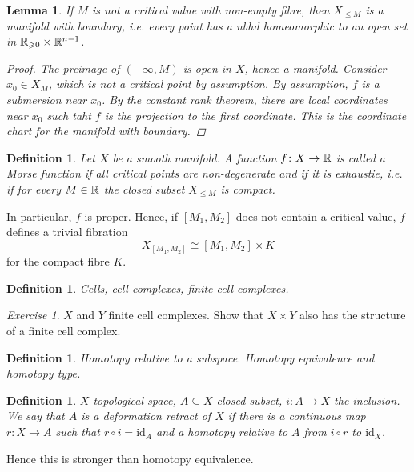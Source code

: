 \documentclass[A4paper, british, reqno]{amsart}
\theoremstyle{darkgreentheorem}
\newtheorem{lm}[thm]{Lemma}
\theoremstyle{darkbluedefinition}
\newtheorem{defn}[thm]{Definition}
\theoremstyle{darkredexample}
\theoremstyle{remark}
\newtheorem{exe}[thm]{Exercise}
\newcommand{\1}{\mathbbm{1}}
\newcommand{\id}{\mathrm{id}}
\newcommand{\sub}{\subseteq}
\begin{document}
\begin{lm}
    If $M$ is not a critical value with non-empty fibre, then $X_{\leqslant M}$ is a manifold with boundary, i.e. every point has a nbhd homeomorphic to an open set in $\mathbb{R}_{\geqslant 0}\times \mathbb{R}^{n-1}$.
    \begin{proof}
	The preimage of $(-\infty,M)$ is open in $X$, hence a manifold.
	Consider $x_{0}\in X_{M}$, which is not a critical point by assumption.
	By assumption, $f$ is a submersion near $x_{0}$.
	By the constant rank theorem, there are local coordinates near $x_{0}$ such taht $f$ is the projection to the first coordinate.
	This is the coordinate chart for the manifold with boundary.
    \end{proof}
\end{lm}

\begin{defn}
    Let $X$ be a smooth manifold.
    A function $f\colon X\to \mathbb{R}$ is called a \textit{Morse function} if all critical points are non-degenerate and if it is exhaustie, i.e. if for every $M\in \mathbb{R}$ the closed subset $X_{\leqslant M}$ is compact.
\end{defn}

In particular, $f$ is proper.
Hence, if $[M_{1},M_{2}]$ does not contain a critical value, $f$ defines a trivial fibration
\[ X_{[M_{1},M_{2}]}\cong [M_{1},M_{2}]\times K \]
for the compact fibre $K$.

\begin{defn}
    Cells, cell complexes, finite cell complexes.
\end{defn}

\begin{exe}
    $X$ and $Y$ finite cell complexes.
    Show that $X\times Y$ also has the structure of a finite cell complex.
\end{exe}

\begin{defn}
    Homotopy relative to a subspace.
    Homotopy equivalence and homotopy type.
\end{defn}

\begin{defn}
    $X$ topological space, $A\sub X$ closed subset, $i\colon A\to X$ the inclusion.
    We say that $A$ is a \textit{deformation retract} of $X$ if there is a continuous map $r\colon X\to A$ such that $r\circ i=\id_{A}$ and a homotopy relative to $A$ from $i\circ r$ to $\id_{X}$.
\end{defn}

Hence this is stronger than homotopy equivalence.
\end{document}
